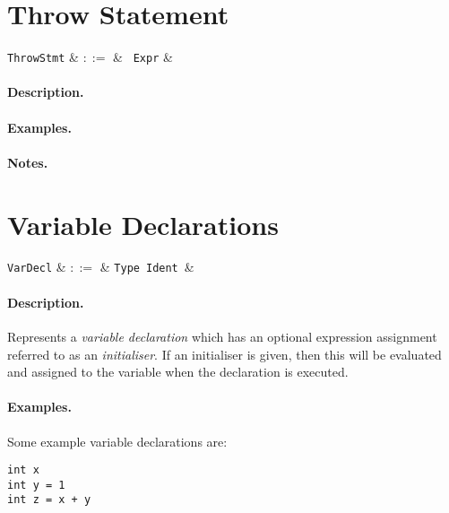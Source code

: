 
\section{Throw Statement}

\begin{syntax}
  \verb+ThrowStmt+ & $::=$ & \ \verb+Expr+ &\\
\end{syntax}

\paragraph{Description.}

\paragraph{Examples.}

\paragraph{Notes.} 


\section{Variable Declarations}

\begin{syntax}
  \verb+VarDecl+ & $::=$ & \verb+Type+\ \verb+Ident+\ \big[\
  \token{=}\ \verb+Expr+\ \big]&\\
\end{syntax}

\paragraph{Description.}  Represents a {\em variable declaration}
which has an optional expression assignment referred to as an {\em
  initialiser}.  If an initialiser is given, then this will be evaluated and assigned to the variable when the declaration is executed.

\paragraph{Examples.} Some example variable declarations are:
\begin{lstlisting}
int x
int y = 1
int z = x + y
\end{lstlisting}

